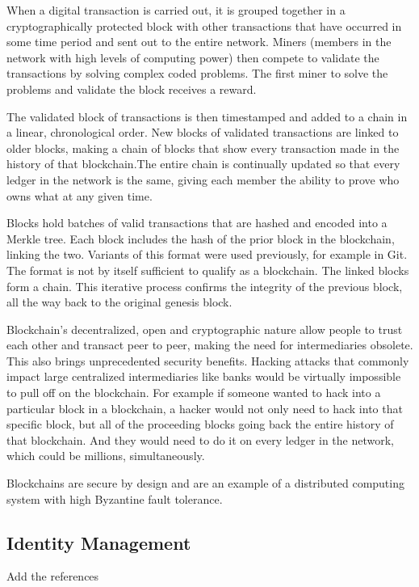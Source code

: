 When a digital transaction is carried out, it is grouped together in a cryptographically protected block with other transactions that have occurred in some time period and sent out to the entire network. Miners (members in the network with high levels of computing power) then compete to validate the transactions by solving complex coded problems. The first miner to solve the problems and validate the block receives a reward.

The validated block of transactions is then timestamped and added to a chain in a linear, chronological order. New blocks of validated transactions are linked to older blocks, making a chain of blocks that show every transaction made in the history of that blockchain.The entire chain is continually updated so that every ledger in the network is the same, giving each member the ability to prove who owns what at any given time.

Blocks hold batches of valid transactions that are hashed and encoded into a Merkle tree. Each block includes the hash of the prior block in the blockchain, linking the two. Variants of this format were used previously, for example in Git. The format is not by itself sufficient to qualify as a blockchain. The linked blocks form a chain. This iterative process confirms the integrity of the previous block, all the way back to the original genesis block.

Blockchain’s decentralized, open and cryptographic nature allow people to trust each other and transact peer to peer, making the need for intermediaries obsolete. This also brings unprecedented security benefits. Hacking attacks that commonly impact large centralized intermediaries like banks would be virtually impossible to pull off on the blockchain. For example if someone wanted to hack into a particular block in a blockchain, a hacker would not only need to hack into that specific block, but all of the proceeding blocks going back the entire history of that blockchain. And they would need to do it on every ledger in the network, which could be millions, simultaneously.

Blockchains are secure by design and are an example of a distributed computing system with high Byzantine fault tolerance.

\subsection{Identity Management}
\begin{notation}
  Add the references
\end{notation}

